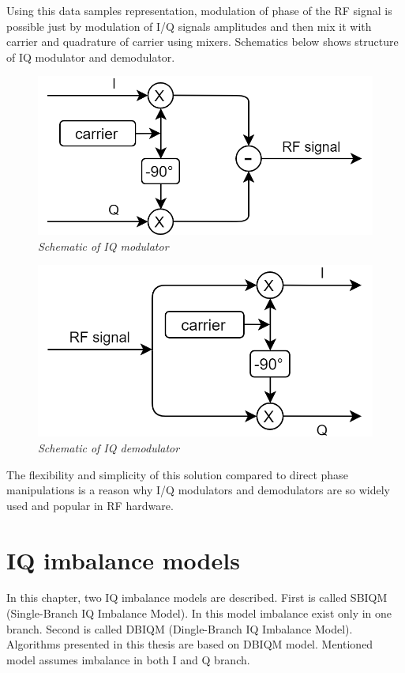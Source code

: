 \documentclass[en,printmode]{mgr}
\begin{document}
		Using this data samples representation, modulation of phase of the RF signal is possible just by modulation of
		I/Q signals amplitudes and then mix it with carrier and quadrature of carrier using mixers. Schematics below 
		shows structure of IQ modulator and demodulator.
		
		\begin{figure}[!htb]
    		\centering
   			\includegraphics[width=\textwidth]{images/iqmod.png}
    		\caption{\textit{Schematic of IQ modulator}}
    		\label{fig:polarplot}
		\end{figure}
		
		\begin{figure}[!htb]
    		\centering
   			\includegraphics[width=\textwidth]{images/iqdemod.png}
    		\caption{\textit{Schematic of IQ demodulator}}
    		\label{fig:polarplot}
		\end{figure}
		\newpage
		The flexibility and simplicity of this solution compared to direct phase manipulations
		is a reason why I/Q modulators and demodulators are so widely used and popular in RF hardware.
		

	\section{IQ imbalance models}
	In this chapter, two IQ imbalance models are described. First is called SBIQM (Single-Branch IQ Imbalance Model).
	In this model imbalance exist only in one branch. Second is called DBIQM (Dingle-Branch IQ Imbalance Model).
	Algorithms presented in this thesis are based on DBIQM model. Mentioned model assumes imbalance in both I
	and Q branch.
\end{document}
